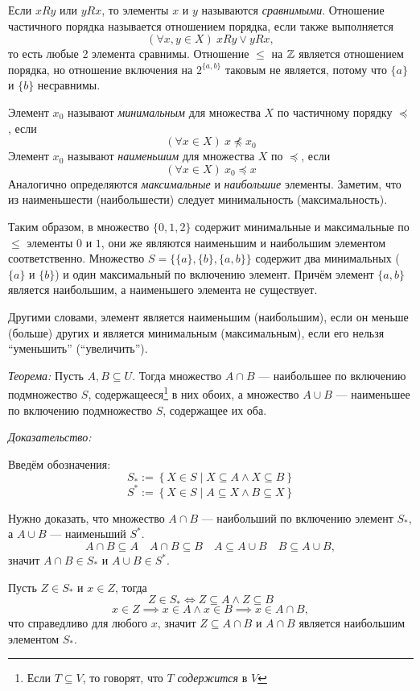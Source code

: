 Если $xRy$ или $yRx$, то элементы $x$ и $y$ называются {\it сравнимыми}.
Отношение частичного порядка называется отношением порядка, если также выполняется
\[
	(\forall x,y\in X)~xRy\lor yRx,
\]
то есть любые 2 элемента сравнимы. Отношение $\leq$ на $\mathbb Z$ является отношением порядка,
но отношение включения на $2^{\{a,b\}}$ таковым не является,
потому что $\{a\}$ и $\{b\}$ несравнимы.

Элемент $x_0$ называют {\it минимальным} для множества $X$ по частичному порядку
$\preceq$, если
\[
	(\forall x\in X)~x\npreceq x_0
\]
Элемент $x_0$ называют {\it наименьшим} для множества $X$ по $\preceq$, если
\[
	(\forall x\in X)~x_0\preceq x
\]
Аналогично определяются {\it максимальные} и {\it наибольшие} элементы.
Заметим, что из наименьшести (наибольшести) следует минимальность (максимальность).

Таким образом, в множество $\{0,1,2\}$ содержит минимальные и максимальные по $\leq$
элементы $0$ и $1$, они же являются наименьшим и наибольшим элементом соответственно.
Множество $S=\{\{a\},\{b\},\{a,b\}\}$ содержит
два минимальных ($\{a\}$ и $\{b\}$) и один максимальный
по включению элемент. Причём элемент $\{a,b\}$ является наибольшим, а
наименьшего элемента не существует.

Другими словами, элемент является наименьшим (наибольшим),
если он меньше (больше) других и является минимальным (максимальным), если его нельзя
``уменьшить'' (``увеличить'').

\vspace{1em}
{\it Теорема:} Пусть $A,B\subseteq U$. Тогда множество $A\cap B$ ---
наибольшее по включению подмножество $S$, содержащееся\footnote{Если $T\subseteq V$,
то говорят, что $T$ {\it содержится} в $V$} в них обоих,
а множество $A\cup B$ --- наименьшее по включению подмножество $S$,
содержащее их оба.

{\it Доказательство:}

Введём обозначения:
\[
	S_{*}:=\left\{X\in S\;\big|\; X\subseteq A\land X\subseteq B\right\}
\]
\[
	S^{*}:=\left\{X\in S\;\big|\; A\subseteq X\land B\subseteq X\right\}
\]

Нужно доказать, что множество $A\cap B$ --- наибольший по включению элемент $S_{*}$,
а $A\cup B$ --- наименьший $S^{*}$.
\[
	A\cap B\subseteq A\quad A\cap B\subseteq B\quad
	A\subseteq A\cup B\quad B\subseteq A\cup B,
\]
значит $A\cap B\in S_{*}$ и $A\cup B\in S^{*}$.

Пусть $Z\in S_{*}$ и $x\in Z$, тогда
\[
	Z\in S_{*}\iff Z\subseteq A\land Z\subseteq B
\]
\[
	x\in Z\implies x\in A\land x\in B\implies x\in A\cap B,
\]
что справедливо для любого $x$,
значит $Z\subseteq A\cap B$ и $A\cap B$ является наибольшим элементом $S_{*}$.

